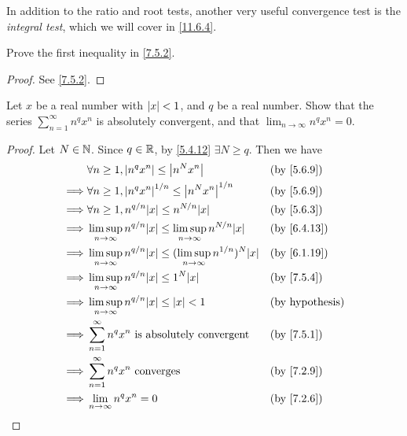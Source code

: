 \begin{rmk}\label{7.5.5}
  In addition to the ratio and root tests, another very useful convergence test is the \emph{integral test}, which we will cover in \cref{11.6.4}.
\end{rmk}

\exercisesection

\begin{ex}\label{ex:7.5.1}
  Prove the first inequality in \cref{7.5.2}.
\end{ex}

\begin{proof}
  See \cref{7.5.2}.
\end{proof}

\begin{ex}\label{ex:7.5.2}
  Let \(x\) be a real number with \(\left\lvert x\right\rvert < 1\), and \(q\) be a real number.
  Show that the series \(\sum_{n = 1}^\infty n^q x^n\) is absolutely convergent, and that \(\lim_{n \to \infty} n^q x^n = 0\).
\end{ex}

\begin{proof}
  Let \(N \in \mathbb{N}\).
  Since \(q \in \mathbb{R}\), by \cref{5.4.12} \(\exists N \geq q\).
  Then we have
  \begin{align*}
             & \forall n \geq 1, \abs{n^q x^n} \leq \abs{n^N x^n}                                         &  & \by{5.6.9}             \\
    \implies & \forall n \geq 1, \abs{n^q x^n}^{1 / n} \leq \abs{n^N x^n}^{1 / n}                         &  & \by{5.6.9}             \\
    \implies & \forall n \geq 1, n^{q / n} \abs{x} \leq n^{N / n} \abs{x}                                 &  & \by{5.6.3}             \\
    \implies & \limsup_{n \to \infty} n^{q / n} \abs{x} \leq \limsup_{n \to \infty} n^{N / n} \abs{x}     &  & \by{6.4.13}            \\
    \implies & \limsup_{n \to \infty} n^{q / n} \abs{x} \leq (\limsup_{n \to \infty} n^{1 / n})^N \abs{x} &  & \by{6.1.19}            \\
    \implies & \limsup_{n \to \infty} n^{q / n} \abs{x} \leq 1^N \abs{x}                                  &  & \by{7.5.4}             \\
    \implies & \limsup_{n \to \infty} n^{q / n} \abs{x} \leq \abs{x} < 1                                  &  & \text{(by hypothesis)} \\
    \implies & \sum_{n = 1}^\infty n^q x^n \text{ is absolutely convergent}                               &  & \by{7.5.1}             \\
    \implies & \sum_{n = 1}^\infty n^q x^n \text{ converges}                                              &  & \by{7.2.9}             \\
    \implies & \lim_{n \to \infty} n^q x^n = 0                                                            &  & \by{7.2.6}
  \end{align*}
\end{proof}

